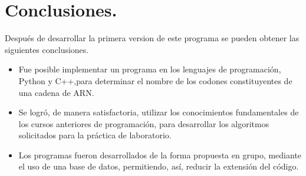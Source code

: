 \section{Conclusiones.}
Después de desarrollar la primera version de este programa se pueden obtener las siguientes conclusiones.
\begin{itemize}
	\item Fue posible implementar un programa en los lenguajes de programación, Python y C++,para determinar el nombre de los codones constituyentes de una cadena de ARN.
	\item Se logró, de manera satisfactoria, utilizar los conocimientos fundamentales de los cursos anteriores de programación, para desarrollar los algoritmos solicitados para la práctica de laboratorio.
	\item Los programas fueron desarrollados de la forma propuesta en grupo, mediante el uso de una base de datos, permitiendo, así, reducir la extensión del código.
\end{itemize}

